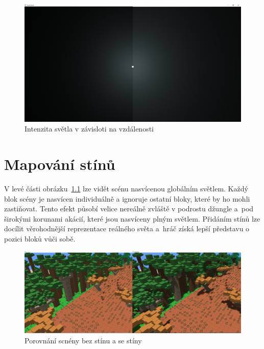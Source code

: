 \documentclass[thesis=M,czech]{FITthesis}[2019/12/23]
\begin{document}
\begin{figure}\centering
	\includegraphics[width=\textwidth]{images/light}
	\caption[Intenzita světla v závisloti na vzdálenosti]{Intenzita světla v závisloti na vzdálenosti}\label{fig:light}
\end{figure}


\chapter{Mapování stínů}

V levé části obrázku~\ref{fig:shadows_intro} lze vidět scénu nasvícenou globálním světlem. Každý blok scény je nasvícen individuálně a ignoruje ostatní bloky, které by ho mohli zastiňovat. Tento efekt působí velice nereálně zvláště v podrostu džungle a~pod širokými korunami akácií, které jsou nasvíceny plným světlem. Přidáním stínů lze docílit věrohodnější reprezentace reálného světa a~hráč získá lepší představu o pozici bloků vůči sobě.

\begin{figure}\centering
	\includegraphics[width=\textwidth]{images/shadows/intro}
	\caption[Porovnání scnény bez stínu a se stíny]{Porovnání scnény bez stínu a se stíny}\label{fig:shadows_intro}
\end{figure}
\end{document}
